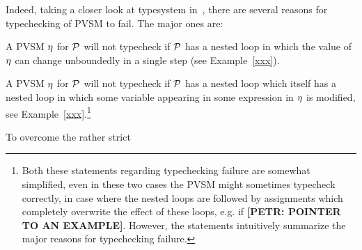 Indeed, taking a closer look at typesystem in~\cite{HolgerPOPL}, there are several reasons for typechecking of PVSM to fail. The major ones are:
\begin{compactenum}
\item
A PVSM $\eta$ for \PP{} $\mathcal{P}$ will not typecheck if $\mathcal{P}$ has a nested loop in which the value of $\eta$ can change unboundedly in a single step (see Example~\ref{xxx}). 
\item
A PVSM $\eta$ for  \PP{} $\mathcal{P}$ will not typecheck if $\mathcal{P}$ has a nested loop which itself has a nested loop in which some variable appearing in some expression in $\eta$ is modified, see Example~\ref{xxx}.\footnote{Both these statements regarding typechecking failure are somewhat simplified, even in these two cases the PVSM might sometimes typecheck correctly, in case where the nested loops are followed by assignments which completely overwrite the effect of these loops, e.g. if \textbf{[PETR: POINTER TO AN EXAMPLE]}. However, the statements intuitively summarize the major reasons for typechecking failure. }
\end{compactenum}

To overcome the rather strict 


